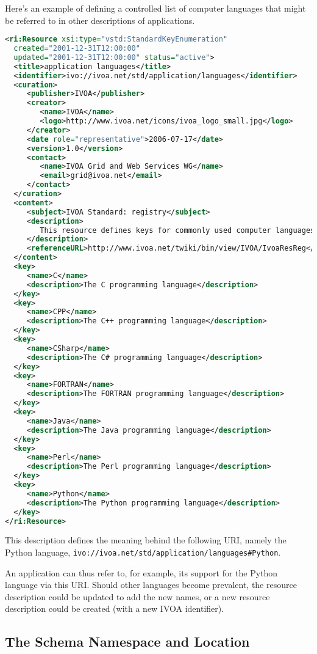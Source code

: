 \documentclass[11pt,a4paper]{ivoa}
\begin{document}
Here's an example of defining a controlled list of computer languages
that might be referred to in other descriptions of applications.

\begin{lstlisting}[language=xml]
<ri:Resource xsi:type="vstd:StandardKeyEnumeration" 
  created="2001-12-31T12:00:00"
  updated="2001-12-31T12:00:00" status="active">
  <title>application languages</title>
  <identifier>ivo://ivoa.net/std/application/languages</identifier>
  <curation>
     <publisher>IVOA</publisher>
     <creator>
        <name>IVOA</name>
        <logo>http://www.ivoa.net/icons/ivoa_logo_small.jpg</logo>
     </creator>
     <date role="representative">2006-07-17</date>
     <version>1.0</version>
     <contact>
        <name>IVOA Grid and Web Services WG</name>
        <email>grid@ivoa.net</email>
     </contact>
  </curation>
  <content>
     <subject>IVOA Standard: registry</subject>
     <description>
        This resource defines keys for commonly used computer languages.
     </description>
     <referenceURL>http://www.ivoa.net/twiki/bin/view/IVOA/IvoaResReg</referenceURL>
  </content>
  <key>
     <name>C</name>
     <description>The C programming language</description>
  </key>
  <key>
     <name>CPP</name>
     <description>The C++ programming language</description>
  </key>
  <key>
     <name>CSharp</name>
     <description>The C# programming language</description>
  </key>
  <key>
     <name>FORTRAN</name>
     <description>The FORTRAN programming language</description>
  </key>
  <key>
     <name>Java</name>
     <description>The Java programming language</description>
  </key>
  <key>
     <name>Perl</name>
     <description>The Perl programming language</description>
  </key>
  <key>
     <name>Python</name>
     <description>The Python programming language</description>
  </key>
</ri:Resource>
\end{lstlisting}


This description defines the meaning behind the following URI, namely
the Python language,
\nolinkurl{ivo://ivoa.net/std/application/languages#Python}.

An application can thus refer to, for example, its support for the
Python language via this URI.  Should other languages become
prevalent, the resource description could be updated to add the new
names, or a new resource description could be created (with a new IVOA
identifier). 



\subsection{The Schema Namespace and Location}
\end{document}
